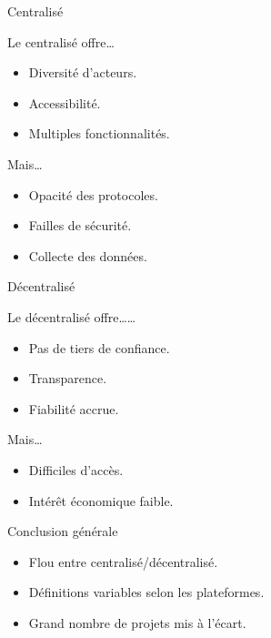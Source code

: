 \begin{frame}{Centralisé}
    \begin{block}{Le centralisé offre\dots}
        \begin{itemize}
            \item Diversité d'acteurs.
            \item Accessibilité.
            \item Multiples fonctionnalités.
        \end{itemize}
    \end{block}
    \begin{block}{Mais\dots}
        \begin{itemize}
            \item Opacité des protocoles.
            \item Failles de sécurité.
            \item Collecte des données.
        \end{itemize}
    \end{block}
\end{frame}


\begin{frame}{Décentralisé}
    \begin{block}{Le décentralisé offre\dots\dots}
        \begin{itemize}
            \item Pas de tiers de confiance.
            \item Transparence.
            \item Fiabilité accrue.
        \end{itemize}
    \end{block}
    \begin{block}{Mais\dots}
        \begin{itemize}
            \item Difficiles d'accès.
            \item Intérêt économique faible.
        \end{itemize}
    \end{block}
\end{frame}

\begin{frame}{Conclusion générale}
    \begin{itemize}
        \item Flou entre centralisé/décentralisé.
        \item Définitions variables selon les plateformes.
        \item Grand nombre de projets mis à l'écart.
    \end{itemize}
\end{frame}

